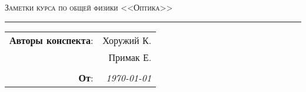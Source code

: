 
\begin{center}
    \LARGE \textsc{Заметки курса по общей физики <<Оптика>>}
\end{center}

\hrule

\phantom{42}

\begin{flushright}
    \begin{tabular}{rr}
        \textbf{Авторы конспекта}: 
        & Хоружий К. \\
        & Примак Е. \\
        &\\
        \textbf{От}: &
        \textit{\today}\\
    \end{tabular}
\end{flushright}

\thispagestyle{empty}
\tableofcontents
\newpage